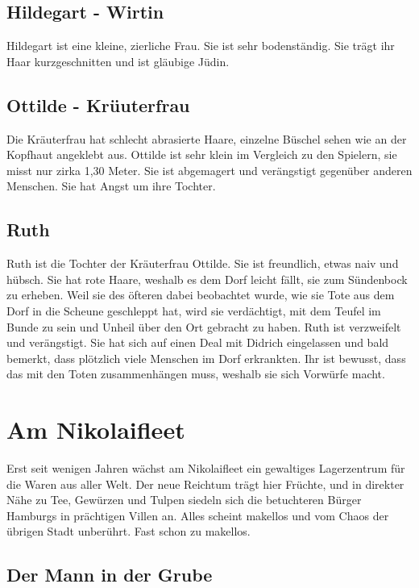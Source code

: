 \subsection{Hildegart - Wirtin}

Hildegart ist eine kleine, zierliche Frau. Sie ist sehr bodenständig. Sie trägt ihr Haar kurzgeschnitten und ist gläubige Jüdin.

\subsection{Ottilde - Krüuterfrau}

Die Kräuterfrau hat schlecht abrasierte Haare, einzelne Büschel sehen wie an der Kopfhaut angeklebt aus. Ottilde ist sehr klein im Vergleich zu den Spielern, sie misst nur zirka 1,30 Meter. Sie ist abgemagert und verängstigt gegenüber anderen Menschen. Sie hat Angst um ihre Tochter.

\subsection{Ruth}

Ruth ist die Tochter der Kräuterfrau Ottilde. Sie ist freundlich, etwas naiv und hübsch. Sie hat rote Haare, weshalb es dem Dorf leicht fällt, sie zum Sündenbock zu erheben. Weil sie des öfteren dabei beobachtet wurde, wie sie Tote aus dem Dorf in die Scheune geschleppt hat, wird sie verdächtigt, mit dem Teufel im Bunde zu sein und Unheil über den Ort gebracht zu haben. Ruth ist verzweifelt und verängstigt. Sie hat sich auf einen Deal mit Didrich eingelassen und bald bemerkt, dass plötzlich viele Menschen im Dorf erkrankten. Ihr ist bewusst, dass das mit den Toten zusammenhängen muss, weshalb sie sich Vorwürfe macht.


\section{Am Nikolaifleet}

Erst seit wenigen Jahren wächst am Nikolaifleet ein gewaltiges Lagerzentrum für die Waren aus aller Welt. Der neue Reichtum trägt hier Früchte, und in direkter Nähe zu Tee, Gewürzen und Tulpen siedeln sich die betuchteren Bürger Hamburgs in prächtigen Villen an. Alles scheint makellos und vom Chaos der übrigen Stadt unberührt. Fast schon zu makellos.

\subsection{Der Mann in der Grube}


